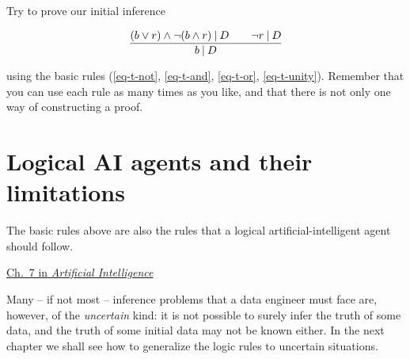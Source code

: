 \documentclass[
  a4paper,
  DIV=11,
  numbers=noendperiod,
  oneside]{scrreprt}
\begin{document}
\begin{tcolorbox}[enhanced jigsaw, rightrule=.15mm, colbacktitle=quarto-callout-caution-color!10!white, coltitle=black, titlerule=0mm, title={\faIcon{pen} Exercise}, colback=white, bottomrule=.15mm, toptitle=1mm, opacitybacktitle=0.6, toprule=.15mm, arc=.35mm, bottomtitle=1mm, colframe=quarto-callout-caution-color-frame, breakable, left=2mm, opacityback=0, leftrule=.75mm]

Try to prove our initial inference

\[
\frac{
(b \lor r) \land \lnot (b \land r) \nonscript\:\vert\nonscript\:\mathopen{} D
\qquad
\lnot r \nonscript\:\vert\nonscript\:\mathopen{} D
}{
b\nonscript\:\vert\nonscript\:\mathopen{} D
}
\]

using the basic rules (\ref{eq-t-not}, \ref{eq-t-and}, \ref{eq-t-or},
\ref{eq-t-unity}). Remember that you can use each rule as many times as
you like, and that there is not only one way of constructing a proof.

\end{tcolorbox}

\hypertarget{logical-ai-agents-and-their-limitations}{%
\section{Logical AI agents and their
limitations}\label{logical-ai-agents-and-their-limitations}}

The basic rules above are also the rules that a logical
artificial-intelligent agent should follow.

\begin{tcolorbox}[enhanced jigsaw, rightrule=.15mm, colbacktitle=quarto-callout-caution-color!10!white, coltitle=black, titlerule=0mm, title={\faIcon{book-open} Reading}, colback=white, bottomrule=.15mm, toptitle=1mm, opacitybacktitle=0.6, toprule=.15mm, arc=.35mm, bottomtitle=1mm, colframe=quarto-callout-caution-color-frame, breakable, left=2mm, opacityback=0, leftrule=.75mm]

\href{https://hvl.instructure.com/courses/25074/modules/items/660089}{Ch.~7
in \emph{Artificial Intelligence}}

\end{tcolorbox}

Many -- if not most -- inference problems that a data engineer must face
are, however, of the \emph{uncertain} kind: it is not possible to surely
infer the truth of some data, and the truth of some initial data may not
be known either. In the next chapter we shall see how to generalize the
logic rules to uncertain situations.
\end{document}
